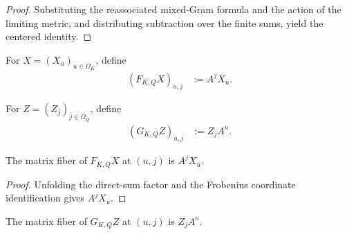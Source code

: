 \begin{proof}
    \leanok
    Substituting the reassociated mixed-Gram formula and the action of the
    limiting metric, and distributing subtraction over the finite sums, yield
    the centered identity.
\end{proof}

\begin{definition}
    \label{def:whole_increment_left_overlap_factor}
    \leanok
    For $X=(X_u)_{u\in\Omega_K}$, define
    \begin{align}
        (F_{K,Q}X)_{u,j} & :=A^jX_u.
    \end{align}
\end{definition}

\begin{definition}
    \label{def:whole_increment_right_overlap_factor}
    \leanok
    For $Z=(Z_j)_{j\in\Omega_Q}$, define
    \begin{align}
        (G_{K,Q}Z)_{u,j} & :=Z_jA^u.
    \end{align}
\end{definition}

\begin{lemma}
    \label{thm:whole_increment_left_overlap_factor_apply}
    \leanok
    The matrix fiber of $F_{K,Q}X$ at $(u,j)$ is $A^jX_u$.
\end{lemma}

\begin{proof}
    \leanok
    Unfolding the direct-sum factor and the Frobenius coordinate identification
    gives $A^jX_u$.
\end{proof}

\begin{lemma}
    \label{thm:whole_increment_right_overlap_factor_apply}
    \leanok
    The matrix fiber of $G_{K,Q}Z$ at $(u,j)$ is $Z_jA^u$.
\end{lemma}

